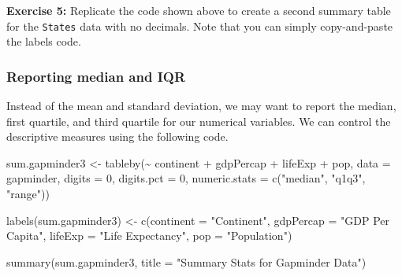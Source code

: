 \documentclass[
]{book}
\makeatletter
\newenvironment{Shaded}{\begin{snugshade}}{\end{snugshade}}
\newcommand{\AttributeTok}[1]{\textcolor[rgb]{0.61,0.61,0.61}{#1}}
\newcommand{\DecValTok}[1]{\textcolor[rgb]{0.06,0.06,0.06}{#1}}
\newcommand{\FunctionTok}[1]{\textcolor[rgb]{0,0,0}{#1}}
\newcommand{\NormalTok}[1]{#1}
\newcommand{\OtherTok}[1]{\textcolor[rgb]{0.37,0.37,0.37}{#1}}
\newcommand{\SpecialCharTok}[1]{\textcolor[rgb]{0,0,0}{#1}}
\newcommand{\StringTok}[1]{\textcolor[rgb]{0.5,0.5,0.5}{#1}}
\newenvironment{kframe}{%
\medskip{}
\setlength{\fboxsep}{.8em}
 \def\at@end@of@kframe{}%
 \ifinner\ifhmode%
  \def\at@end@of@kframe{\end{minipage}}%
  \begin{minipage}{\columnwidth}%
 \fi\fi%
 \def\FrameCommand##1{\hskip\@totalleftmargin \hskip-\fboxsep
 \colorbox{shadecolor}{##1}\hskip-\fboxsep
     \hskip-\linewidth \hskip-\@totalleftmargin \hskip\columnwidth}%
 \MakeFramed {\advance\hsize-\width
   \@totalleftmargin\z@ \linewidth\hsize
   \@setminipage}}%
 {\par\unskip\endMakeFramed%
 \at@end@of@kframe}
\renewenvironment{Shaded}{\begin{kframe}}{\end{kframe}}
\newenvironment{rmdblock}[1]
  {\begin{shaded*}
  }
  {\end{shaded*}
  }
\newenvironment{learncheck}
  {\begin{rmdblock}{warning}}
  {\end{rmdblock}}
\makeatother
\begin{document}
\begin{learncheck}
\textbf{Exercise 5:} Replicate the code shown above to create a second
summary table for the \texttt{States} data with no decimals. Note that
you can simply copy-and-paste the labels code.
\end{learncheck}

\hypertarget{reporting-median-and-iqr}{%
\subsubsection{Reporting median and IQR}\label{reporting-median-and-iqr}}

Instead of the mean and standard deviation, we may want to report the median, first quartile, and third quartile for our numerical variables. We can control the descriptive measures using the following code.

\begin{Shaded}
\begin{Highlighting}[]
\NormalTok{sum.gapminder3 }\OtherTok{\textless{}{-}} \FunctionTok{tableby}\NormalTok{(}\SpecialCharTok{\textasciitilde{}}\NormalTok{ continent }\SpecialCharTok{+}\NormalTok{ gdpPercap }\SpecialCharTok{+}\NormalTok{ lifeExp }\SpecialCharTok{+}\NormalTok{ pop, }\AttributeTok{data =}\NormalTok{ gapminder, }\AttributeTok{digits =} \DecValTok{0}\NormalTok{, }\AttributeTok{digits.pct =} \DecValTok{0}\NormalTok{, }\AttributeTok{numeric.stats =} \FunctionTok{c}\NormalTok{(}\StringTok{"median"}\NormalTok{, }\StringTok{"q1q3"}\NormalTok{, }\StringTok{"range"}\NormalTok{))}

\FunctionTok{labels}\NormalTok{(sum.gapminder3) }\OtherTok{\textless{}{-}} \FunctionTok{c}\NormalTok{(}\AttributeTok{continent =} \StringTok{"Continent"}\NormalTok{, }\AttributeTok{gdpPercap =} \StringTok{"GDP Per Capita"}\NormalTok{, }\AttributeTok{lifeExp =} \StringTok{"Life Expectancy"}\NormalTok{, }\AttributeTok{pop =} \StringTok{"Population"}\NormalTok{)}
\end{Highlighting}
\end{Shaded}

\begin{Shaded}
\begin{Highlighting}[]
\FunctionTok{summary}\NormalTok{(sum.gapminder3, }\AttributeTok{title =} \StringTok{"Summary Stats for Gapminder Data"}\NormalTok{)}
\end{Highlighting}
\end{Shaded}
\end{document}
